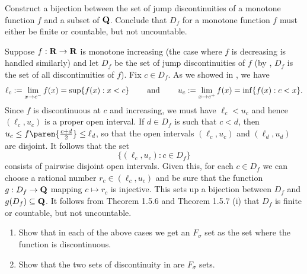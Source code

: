 \documentclass{lew98_solutions}
\begin{document}
\begin{exercise}
\label{ex:4.6.6}
    Construct a bijection between the set of jump discontinuities of a monotone function \( f \) and a subset of \( \mathbf{Q} \). Conclude that \( D_f \) for a monotone function \( f \) must either be finite or countable, but not uncountable.
\end{exercise}

\begin{solution}
    Suppose \( f : \mathbf{R} \to \mathbf{R} \) is monotone increasing (the case where \( f \) is decreasing is handled similarly) and let \( D_f \) be the set of jump discontinuities of \( f \) (by , \( D_f \) is the set of all discontinuities of \( f \)). Fix \( c \in D_f \). As we showed in , we have
    \[
        \ell_c := \lim_{x \to c^-} f(x) = \sup \{ f(x) : x < c \} \hspace{8mm} \text{and} \hspace{8mm} u_c := \lim_{x \to c^+} f(x) = \inf \{ f(x) : c < x \}.
    \]
    Since \( f \) is discontinuous at \( c \) and increasing, we must have \( \ell_c < u_c \) and hence \( (\ell_c, u_c) \) is a proper open interval. If \( d \in D_f \) is such that \( c < d \), then \( u_c \leq f \paren{\tfrac{c + d}{2}} \leq \ell_d \), so that the open intervals \( (\ell_c, u_c) \) and \( (\ell_d, u_d) \) are disjoint. It follows that the set
    \[
        \{ (\ell_c, u_c) : c \in D_f \}
    \]
    consists of pairwise disjoint open intervals. Given this, for each \( c \in D_f \) we can choose a rational number \( r_c \in (\ell_c, u_c) \) and be sure that the function \( g : D_f \to \mathbf{Q} \) mapping \( c \mapsto r_c \) is injective. This sets up a bijection between \( D_f \) and \( g(D_f) \subseteq \mathbf{Q} \). It follows from Theorem 1.5.6 and Theorem 1.5.7 (i) that \( D_f \) is finite or countable, but not uncountable.
\end{solution}

\begin{exercise}
\label{ex:4.6.7}
    \begin{enumerate}
        \item Show that in each of the above cases we get an \( F_{\sigma} \) set as the set where the function is discontinuous.

        \item Show that the two sets of discontinuity in  are \( F_{\sigma} \) sets.
    \end{enumerate}
\end{exercise}
\end{document}
